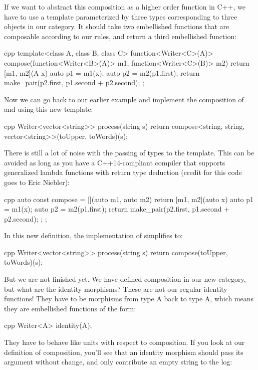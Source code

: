 If we want to abstract this composition as a higher order function in
C++, we have to use a template parameterized by three types
corresponding to three objects in our category. It should take two
embellished functions that are composable according to our rules, and
return a third embellished function:

\begin{snip}{cpp}
template<class A, class B, class C>
function<Writer<C>(A)> compose(function<Writer<B>(A)> m1,
                               function<Writer<C>(B)> m2)
{
    return [m1, m2](A x) {
        auto p1 = m1(x);
        auto p2 = m2(p1.first);
        return make_pair(p2.first, p1.second + p2.second); 
    };
}
\end{snip}
Now we can go back to our earlier example and implement the composition
of  and  using this new template:

\begin{snip}{cpp}
Writer<vector<string>> process(string s) { 
    return compose<string, string, vector<string>>(toUpper, toWords)(s);
}
\end{snip}
There is still a lot of noise with the passing of types to the
 template. This can be avoided as long as you have a
C++14-compliant compiler that supports generalized lambda functions with
return type deduction (credit for this code goes to Eric Niebler):

\begin{snip}{cpp}
auto const compose = [](auto m1, auto m2) { 
    return [m1, m2](auto x) { 
        auto p1 = m1(x);
        auto p2 = m2(p1.first);
        return make_pair(p2.first, p1.second + p2.second);
    };
};
\end{snip}
In this new definition, the implementation of 
simplifies to:

\begin{snip}{cpp}
Writer<vector<string>> process(string s) {
    return compose(toUpper, toWords)(s);
}
\end{snip}
But we are not finished yet. We have defined composition in our new
category, but what are the identity morphisms? These are not our regular
identity functions! They have to be morphisms from type A back to type
A, which means they are embellished functions of the form:

\begin{snip}{cpp}
Writer<A> identity(A);
\end{snip}
They have to behave like units with respect to composition. If you look
at our definition of composition, you'll see that an identity morphism
should pass its argument without change, and only contribute an empty
string to the log:

